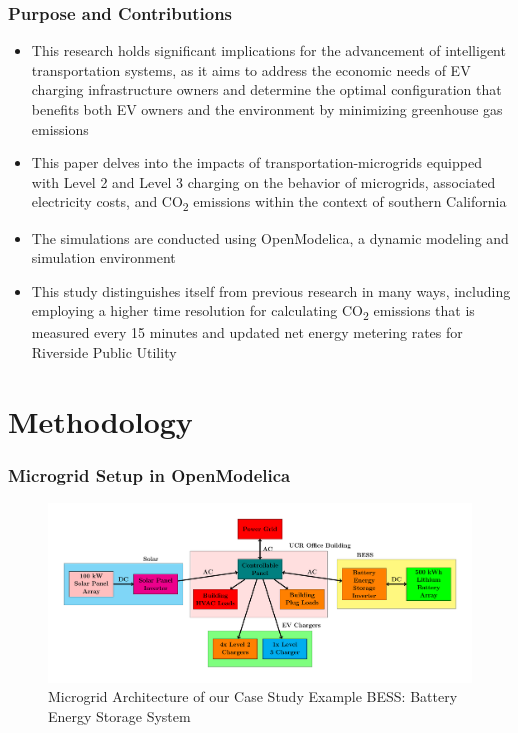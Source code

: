 \documentclass[aspectratio=169, 8 pt]{beamer}
\begin{document}
	\begin{frame}
		\frametitle{Purpose and Contributions}
			\begin{itemize} \LARGE
				\item This research holds significant implications for the advancement of intelligent transportation systems, as it aims to address the economic needs of EV charging infrastructure owners and determine the optimal configuration that benefits both EV owners and the environment by minimizing greenhouse gas emissions
				\item This paper delves into the impacts of transportation-microgrids equipped with Level 2 and Level 3 charging on the behavior of microgrids, associated electricity costs, and CO\textsubscript{2} emissions within the context of southern California
				\item The simulations are conducted using OpenModelica, a dynamic modeling and simulation environment
				\item This study distinguishes itself from previous research in many ways, including employing a higher time resolution for calculating CO\textsubscript{2} emissions that is measured every 15 minutes and updated net energy metering rates for Riverside Public Utility  
			\end{itemize}
	\end{frame}

\section{Methodology}
	
	\begin{frame}
		\frametitle{Microgrid Setup in OpenModelica}
		\begin{figure}
			\centering
			\includegraphics[width=0.9\linewidth]{Fig/power_system_setup_modelica_large}
			\caption{Microgrid Architecture of our Case Study Example BESS: Battery Energy Storage System}
			\label{fig:powersystemsetupfull}
		\end{figure}
	\end{frame}
	
\end{document}
